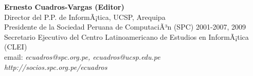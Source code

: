 \begin{center}
\textbf{Ernesto Cuadros-Vargas (Editor)}\\
Director del P.P. de InformÃ¡tica, UCSP, Arequipa\\ %
Presidente de la Sociedad Peruana de ComputaciÃ³n (SPC) 2001-2007, 2009\\
Secretario Ejecutivo del Centro Latinoamericano de Estudios en InformÃ¡tica (CLEI)\\
email: \textit{ecuadros@spc.org.pe, ecuadros@ucsp.edu.pe}\\
\textit{http://socios.spc.org.pe/ecuadros}
\end{center}


